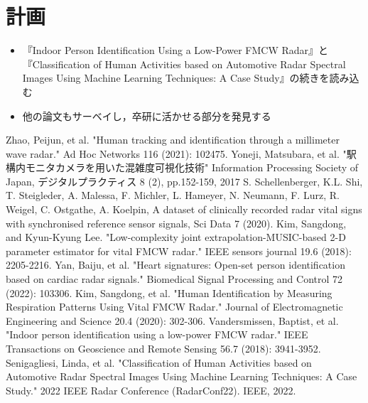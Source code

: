 \documentclass[dvipdfmx]{jsarticle}
\begin{document}
\section{計画}
\begin{itemize}
    \item 『Indoor Person Identification Using a Low-Power FMCW Radar』と『Classification of Human Activities based on Automotive Radar Spectral Images Using Machine Learning Techniques: A Case Study』の続きを読み込む
    \item 他の論文もサーベイし，卒研に活かせる部分を発見する
\end{itemize}

\begin{thebibliography}{99}
     Zhao, Peijun, et al. "Human tracking and identification through a millimeter wave radar." Ad Hoc Networks 116 (2021): 102475.
     Yoneji, Matsubara, et al. "駅構内モニタカメラを用いた混雑度可視化技術" Information Processing Society of Japan, デジタルプラクティス 8 (2), pp.152-159, 2017
     S. Schellenberger, K.L. Shi, T. Steigleder, A. Malessa, F. Michler, L. Hameyer, N. Neumann, F. Lurz, R. Weigel, C. Ostgathe, A. Koelpin, A dataset of clinically recorded radar vital signs with synchronised reference sensor signals, Sci Data 7 (2020).
     Kim, Sangdong, and Kyun-Kyung Lee. "Low-complexity joint extrapolation-MUSIC-based 2-D parameter estimator for vital FMCW radar." IEEE sensors journal 19.6 (2018): 2205-2216.
     Yan, Baiju, et al. "Heart signatures: Open-set person identification based on cardiac radar signals." Biomedical Signal Processing and Control 72 (2022): 103306.
     Kim, Sangdong, et al. "Human Identification by Measuring Respiration Patterns Using Vital FMCW Radar." Journal of Electromagnetic Engineering and Science 20.4 (2020): 302-306. 
     Vandersmissen, Baptist, et al. "Indoor person identification using a low-power FMCW radar." IEEE Transactions on Geoscience and Remote Sensing 56.7 (2018): 3941-3952.
     Senigagliesi, Linda, et al. "Classification of Human Activities based on Automotive Radar Spectral Images Using Machine Learning Techniques: A Case Study." 2022 IEEE Radar Conference (RadarConf22). IEEE, 2022.
\end{thebibliography}
\end{document}
